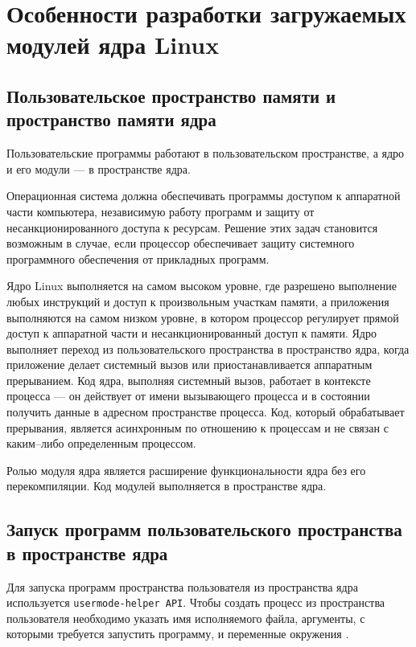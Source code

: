 \section{Особенности разработки загружаемых модулей ядра Linux}

\subsection{Пользовательское пространство памяти и пространство памяти ядра}

Пользовательские программы работают в пользовательском пространстве, а ядро и его модули --- в пространстве ядра.

Операционная система должна обеспечивать программы доступом к аппаратной части компьютера, независимую работу программ и защиту от несанкционированного доступа к ресурсам. Решение этих задач становится возможным в случае, если процессор обеспечивает защиту системного программного обеспечения от прикладных программ.

Ядро Linux выполняется на самом высоком уровне, где разрешено выполнение любых инструкций и доступ к произвольным участкам памяти, а приложения выполняются на самом низком уровне, в котором процессор регулирует прямой доступ к аппаратной части и несанкционированный доступ к памяти. Ядро выполняет переход из пользовательского пространства в пространство ядра, когда приложение делает системный вызов или приостанавливается аппаратным прерыванием. Код ядра, выполняя системный вызов, работает в контексте процесса --- он действует от имени вызывающего процесса и в состоянии получить данные в адресном пространстве процесса. Код, который обрабатывает прерывания, является асинхронным по отношению к процессам и не связан с каким--либо определенным процессом.

Ролью модуля ядра является расширение функциональности ядра без его перекомпиляции. Код модулей выполняется в пространстве ядра.

\subsection{Запуск программ пользовательского пространства в пространстве ядра}

Для запуска программ пространства пользователя из пространства ядра используется \texttt{usermode-helper API}. Чтобы создать процесс из пространства пользователя необходимо указать имя исполняемого файла, аргументы, с которыми требуется запустить программу, и переменные окружения \cite{umhelper}.

